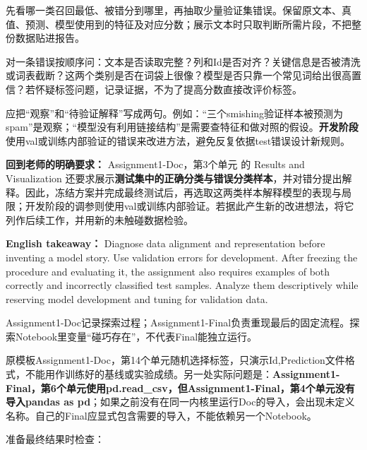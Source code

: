 

先看哪一类召回最低、被错分到哪里，再抽取少量验证集错误。保留原文本、真值、预测、模型使用到的特征及对应分数；展示文本时只取判断所需片段，不把整份数据贴进报告。


对一条错误按顺序问：文本是否读取完整？列和Id是否对齐？关键信息是否被清洗或词表截断？这两个类别是否在词袋上很像？模型是否只靠一个常见词给出很高置信？若怀疑标签问题，记录证据，不为了提高分数直接改评价标签。


应把“观察”和“待验证解释”写成两句。例如：“三个smishing验证样本被预测为spam”是观察；“模型没有利用链接结构”是需要查特征和做对照的假设。\textbf{开发阶段}使用val或训练内部验证的错误来改进方法，避免反复依据test错误设计新规则。


\textbf{回到老师的明确要求：} Assignment1-Doc，第3个单元 的 Results and Visualization 还要求展示\textbf{测试集中的正确分类与错误分类样本}，并对错分提出解释。因此，冻结方案并完成最终测试后，再选取这两类样本解释模型的表现与局限；开发阶段的调参则使用val或训练内部验证。若据此产生新的改进想法，将它列作后续工作，并用新的未触碰数据检验。


\textbf{English takeaway：} Diagnose data alignment and representation before inventing a model story. Use validation errors for development. After freezing the procedure and evaluating it, the assignment also requires examples of both correctly and incorrectly classified test samples. Analyze them descriptively while reserving model development and tuning for validation data.








Assignment1-Doc记录探索过程；Assignment1-Final负责重现最后的固定流程。探索Notebook里变量“碰巧存在”，不代表Final能独立运行。


原模板Assignment1-Doc，第14个单元随机选择标签，只演示Id,Prediction文件格式，不能用作训练好的基线或实验成绩。另一处实际问题是：\textbf{Assignment1-Final，第6个单元使用pd.read\_csv，但Assignment1-Final，第4个单元没有导入pandas as pd}；如果之前没有在同一内核里运行Doc的导入，会出现未定义名称。自己的Final应显式包含需要的导入，不能依赖另一个Notebook。


准备最终结果时检查：



